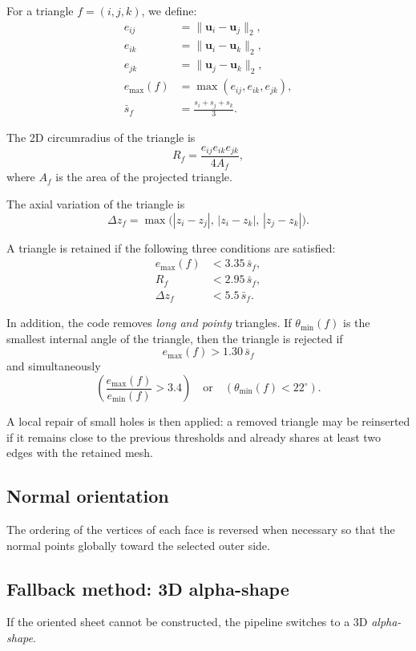 \documentclass[11pt,a4paper]{article}
\begin{document}
For a triangle $f=(i,j,k)$, we define:
\begin{align*}
e_{ij} &= \|\mathbf{u}_i-\mathbf{u}_j\|_2,\\
e_{ik} &= \|\mathbf{u}_i-\mathbf{u}_k\|_2,\\
e_{jk} &= \|\mathbf{u}_j-\mathbf{u}_k\|_2,\\
e_{\max}(f) &= \max(e_{ij},e_{ik},e_{jk}),\\
\bar{s}_f &= \frac{s_i+s_j+s_k}{3}.
\end{align*}

The 2D circumradius of the triangle is
\[
R_f=\frac{e_{ij}e_{ik}e_{jk}}{4A_f},
\]
where $A_f$ is the area of the projected triangle.

The axial variation of the triangle is
\[
\Delta z_f=
\max\big(
|z_i-z_j|,\,
|z_i-z_k|,\,
|z_j-z_k|
\big).
\]

A triangle is retained if the following three conditions are satisfied:
\begin{align*}
e_{\max}(f) &< 3.35\,\bar{s}_f,\\
R_f &< 2.95\,\bar{s}_f,\\
\Delta z_f &< 5.5\,\bar{s}_f.
\end{align*}

In addition, the code removes \emph{long and pointy} triangles. If $\theta_{\min}(f)$ is the smallest internal angle of the triangle, then the triangle is rejected if
\[
e_{\max}(f)>1.30\,\bar{s}_f
\]
and simultaneously
\[
\left(
\frac{e_{\max}(f)}{e_{\min}(f)}>3.4
\right)
\quad\text{or}\quad
\left(
\theta_{\min}(f)<22^\circ
\right).
\]

A local repair of small holes is then applied: a removed triangle may be reinserted if it remains close to the previous thresholds and already shares at least two edges with the retained mesh.

\subsection{Normal orientation}

The ordering of the vertices of each face is reversed when necessary so that the normal points globally toward the selected outer side.

\subsection{Fallback method: 3D alpha-shape}

If the oriented sheet cannot be constructed, the pipeline switches to a 3D \emph{alpha-shape}.
\end{document}
